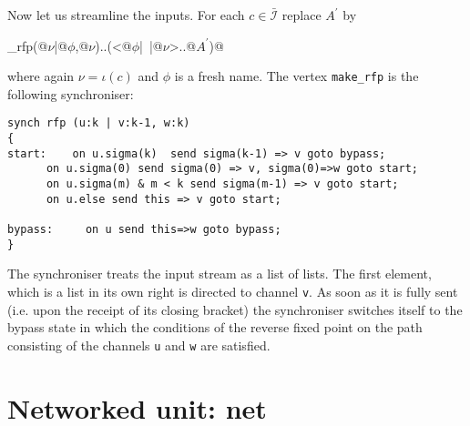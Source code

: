 \documentclass[11pt]{report}
\begin{document}
Now let us streamline the inputs. For each $c\in \bar{\mathcal I}$ replace $A^\prime$ by
\begin{center}
\verb@make_rfp(@$\nu$\verb@|@$\phi$\verb@,@$\nu$\verb@)..(<@$\phi$\verb@|~|@$\nu$\verb@>..@$A^\prime$\verb@)@
\end{center}
where again $\nu=\iota(c)$ and $\phi$ is a fresh name. The vertex \verb$make_rfp$ is the following synchroniser:
\begin{lstlisting}[frame=single]
synch rfp (u:k | v:k-1, w:k)
{
start:	  on u.sigma(k)  send sigma(k-1) => v goto bypass;
	  on u.sigma(0) send sigma(0) => v, sigma(0)=>w goto start;
	  on u.sigma(m) & m < k send sigma(m-1) => v goto start;
	  on u.else send this => v goto start;

bypass: 	on u send this=>w goto bypass;
}
\end{lstlisting}
The synchroniser treats the input stream as a list of lists. The first element, which is a list in its own right is directed to channel \verb$v$. As soon as it is fully sent (i.e. upon the receipt of its closing bracket) the synchroniser switches itself to the bypass state in which the conditions of the reverse fixed point on the path consisting of the channels \verb$u$ and \verb$w$ are satisfied.


\section{Networked unit: net\label{sec:net}}
\end{document}
